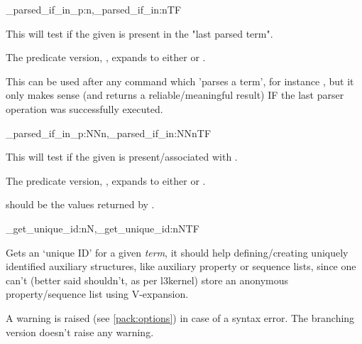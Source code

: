 \documentclass[10pt]{article}
\begin{document}
\begin{codedescribe}[code,EXP,new=2023/05/20]{\starray_parsed_if_in_p:n,\starray_parsed_if_in:nTF}
\begin{codesyntax}%
\end{codesyntax}
This will test if the given  is present in the "last parsed term". 
\end{codedescribe}
\begin{tsremark}
The predicate version, , expands to either  or .
\end{tsremark}
\begin{tsremark}
This can be used after any command which 'parses a term', for instance , but it only makes sense (and returns a reliable/meaningful result) IF the last parser operation was successfully executed.
\end{tsremark}


\begin{codedescribe}[code,EXP,new=2023/11/28]{\starray_parsed_if_in_p:NNn,\starray_parsed_if_in:NNnTF}
\begin{codesyntax}%
\end{codesyntax}
This will test if the given  is present/associated with .
\end{codedescribe}
\begin{tsremark}
The predicate version, , expands to either  or .
\end{tsremark}
\begin{tsremark}
 should be the values returned by .
\end{tsremark}

\begin{codedescribe}[code,new=2024/03/10]{\starray_get_unique_id:nN,\starray_get_unique_id:nNTF}
\begin{codesyntax}%
\end{codesyntax}
Gets an `unique ID' for a given  \emph{term}, it should help defining/creating uniquely identified auxiliary structures, like auxiliary property or sequence lists, since one can't (better said shouldn't, as per l3kernel) store an anonymous property/sequence list using V-expansion. 
\end{codedescribe}
\begin{tsremark}
A warning is raised (see \ref{pack:options}) in case of a  syntax error. The branching version doesn't raise any warning.
\end{tsremark}
\end{document}
